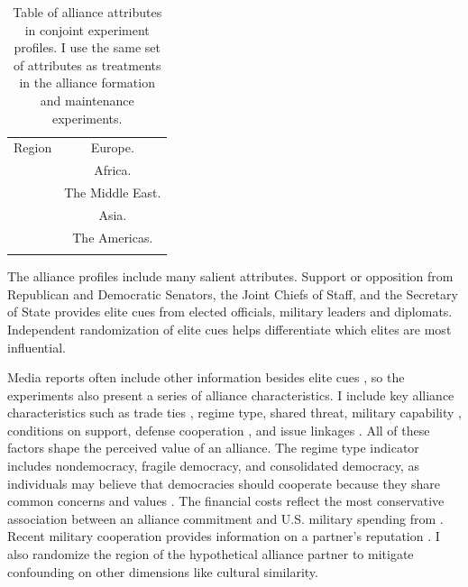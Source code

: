 \documentclass[12pt]{article}
\begin{document}
\begin{table}
\begin{adjustbox}{width = .99\textwidth}
\begin{tabular}{lc}
Region              & Europe. \\ 
                    & Africa. \\
                    & The Middle East. \\ 
                    & Asia. \\   
                    & The Americas. \\ 
                                                                            
\hline \\
\end{tabular}
\end{adjustbox}
\caption{Table of alliance attributes in conjoint experiment profiles. I use the same set of attributes as treatments in the alliance formation and maintenance experiments.} 
\label{tab:conjoint-vars}
\end{table}


The alliance profiles include many salient attributes.
Support or opposition from Republican and Democratic Senators, the Joint Chiefs of Staff, and the Secretary of State provides elite cues from elected officials, military leaders and diplomats. 
Independent randomization of elite cues helps differentiate which elites are most influential.


Media reports often include other information besides elite cues \citep{BaumPotter2008}, so the experiments also present a series of alliance characteristics. 
I include key alliance characteristics such as trade ties \citep{Fordham2010}, regime type, shared threat, military capability \citep{Johnsonetal2015}, conditions on support, defense cooperation \citep{Morrow1994, LeedsAnac2005}, and issue linkages \citep{Poast2012}.
All of these factors shape the perceived value of an alliance. 
The regime type indicator includes nondemocracy, fragile democracy, and consolidated democracy, as individuals may believe that democracies should cooperate because they share common concerns and values \citep{Chuetal2021}. 
The financial costs reflect the most conservative association between an alliance commitment and U.S. military spending from \citet{AlleyFuhrmann2021}. 
Recent military cooperation provides information on a partner's reputation \citep{Crescenzietal2012, GannonKent2020}.
I also randomize the region of the hypothetical alliance partner to mitigate confounding on other dimensions like cultural similarity.
\end{document}
